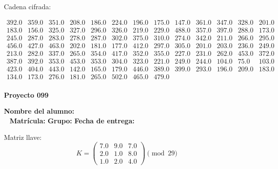 \documentclass[12pt]{article}
\begin{document}
Cadena cifrada:
\begin{center}
$\begin{array}{lllllllllllll}
392.0 & 359.0 & 351.0 & 208.0 & 186.0 & 224.0 & 196.0 & 175.0 & 147.0 & 361.0 & 347.0 & 328.0 & 201.0\\
183.0 & 156.0 & 325.0 & 327.0 & 296.0 & 326.0 & 219.0 & 229.0 & 488.0 & 357.0 & 397.0 & 288.0 & 173.0\\
245.0 & 287.0 & 283.0 & 278.0 & 287.0 & 302.0 & 375.0 & 310.0 & 274.0 & 342.0 & 211.0 & 266.0 & 295.0\\
456.0 & 427.0 & 463.0 & 202.0 & 181.0 & 177.0 & 412.0 & 297.0 & 305.0 & 201.0 & 203.0 & 236.0 & 249.0\\
213.0 & 282.0 & 337.0 & 265.0 & 354.0 & 417.0 & 352.0 & 355.0 & 227.0 & 231.0 & 262.0 & 453.0 & 372.0\\
387.0 & 392.0 & 353.0 & 453.0 & 353.0 & 304.0 & 323.0 & 221.0 & 249.0 & 244.0 & 104.0 & 75.0 & 103.0\\
423.0 & 404.0 & 443.0 & 142.0 & 165.0 & 179.0 & 446.0 & 389.0 & 399.0 & 293.0 & 196.0 & 209.0 & 183.0\\
134.0 & 173.0 & 276.0 & 181.0 & 265.0 & 502.0 & 465.0 & 479.0\\
\end{array}$
\end{center}

\newpage


\textbf{Proyecto 099}

\textbf{Nombre del alumno:} \underline{\hspace{13cm}}\\\
\vspace{1cm}
\textbf{Matrícula:} \underline{\hspace{4cm}} \hspace{1cm}
\textbf{Grupo:} \underline{\hspace{2cm}}
\textbf{Fecha de entrega:} \underline{\hspace{2cm}}

\medskip

Matriz llave:
\[
K = \begin{pmatrix}
7.0 & 9.0 & 7.0\\
2.0 & 1.0 & 8.0\\
1.0 & 2.0 & 4.0
\end{pmatrix} \pmod{29}
\]
\end{document}
